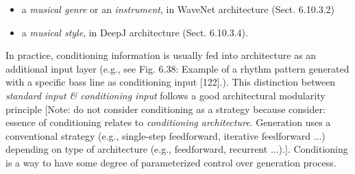 \documentclass{article}
\begin{document}
\begin{itemize}
\begin{itemize}
\begin{itemize}
\begin{itemize}
				\item a {\it musical genre} or an {\it instrument}, in WaveNet architecture (Sect. 6.10.3.2)
				\item a {\it musical style}, in DeepJ architecture (Sect. 6.10.3.4).
			\end{itemize}
			In practice, conditioning information is usually fed into architecture as an additional input layer (e.g., see {\sf Fig. 6.38: Example of a rhythm pattern generated with a specific bass line as conditioning input [122].}). This distinction between {\it standard input \& conditioning input} follows a good architectural modularity principle [Note: do not consider conditioning as a strategy because consider: essence of conditioning relates to {\it conditioning architecture}. Generation uses a conventional strategy (e.g., single-step feedforward, iterative feedforward $\ldots$) depending on type of architecture (e.g., feedforward, recurrent $\ldots$).]. Conditioning is a way to have some degree of parameterized control over generation process.


\end{itemize}
\end{itemize}
\end{itemize}
\end{document}

